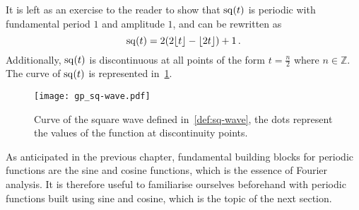 It is left as an exercise to the reader to show that $\operatorname{sq}(t)$ is periodic with fundamental
period $1$ and amplitude $1$, and can be rewritten as
\begin{equation}
  \operatorname{sq}(t)=2(2\lfloor t\rfloor-\lfloor 2t\rfloor)+1\,.
\end{equation}
Additionally, $\operatorname{sq}(t)$ is discontinuous at all points of the form $t=\frac{n}{2}$ where
$n\in\mathbb{Z}$. The curve of $\operatorname{sq}(t)$ is represented in~\cref{fig:sq-wave}.
\begin{figure}[t]
  \centering
  \texttt{[image: gp\_sq-wave.pdf]}
  \caption{Curve of the square wave defined in~\cref{def:sq-wave}, the dots represent the
  values of the function at discontinuity points.}
  \label{fig:sq-wave}
\end{figure}

As anticipated in the previous chapter, fundamental building blocks for periodic functions
are the sine and cosine functions, which is the essence of Fourier analysis. It is
therefore useful to familiarise ourselves beforehand with periodic functions built using
sine and cosine, which is the topic of the next section.
